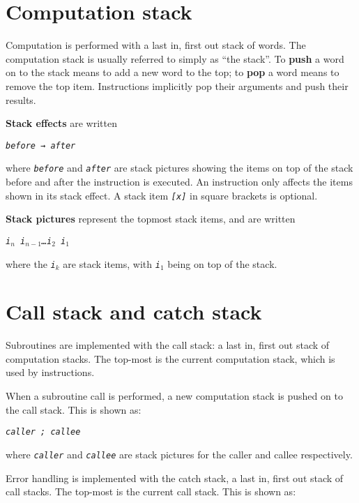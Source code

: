 \documentclass[a4paper]{article}
\newcommand{\spic}[1]{\texttt{\slshape{#1\/}}}
\begin{document}
\section{Computation stack}

Computation is performed with a last in, first out stack of words. The computation stack is usually referred to simply as “the stack”. To {\bf push} a word on to the stack means to add a new word to the top; to {\bf pop} a word means to remove the top item. Instructions implicitly pop their arguments and push their results.

{\bf Stack effects} are written

\begin{center}
  {\tt \spic{before → after}}
\end{center}

\noindent where \spic{before} and \spic{after} are stack pictures showing the items on top of the stack before and after the instruction is executed. An instruction only affects the items shown in its stack effect. A stack item \spic{[x]} in square brackets is optional.

{\bf Stack pictures} represent the topmost stack items, and are written

\begin{center}
\spic{i$_n$ i$_{n-1}$\dots i$_2$ i$_1$}
\end{center}

\noindent where the \spic{i$_k$} are stack items, with \spic{i$_1$} being on top of the stack.


\section{Call stack and catch stack}
\label{callstack}

Subroutines are implemented with the call stack: a last in, first out stack of computation stacks. The top-most is the current computation stack, which is used by instructions.

When a subroutine call is performed, a new computation stack is pushed on to the call stack. This is shown as:

\begin{center}
  {\tt \spic{caller ; callee}}
\end{center}

\noindent where \spic{caller} and \spic{callee} are stack pictures for the caller and callee respectively.

Error handling is implemented with the catch stack, a last in, first out stack of call stacks. The top-most is the current call stack. This is shown as:
\end{document}
